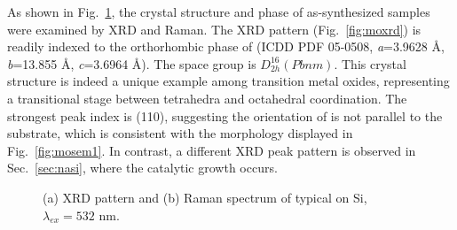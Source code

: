 As shown in Fig.~\ref{fig:mooxch}, the crystal structure and phase of as-synthesized samples were examined by XRD and Raman. The XRD pattern (Fig.~\ref{fig:moxrd}) is readily indexed to the orthorhombic phase of  (ICDD PDF 05-0508, \emph{a}=3.9628 \AA, \emph{b}=13.855 \AA, \emph{c}=3.6964 \AA). The space group is $D_{2h}^{16}(Pbnm)$. This crystal structure is indeed a unique example among transition metal oxides, representing a transitional stage between tetrahedra and octahedral coordination.\cite{Itoh2001a} The strongest peak index is (110), suggesting the orientation of  is not parallel to the substrate, which is consistent with the morphology displayed in Fig.~\ref{fig:mosem1}. In contrast, a different XRD peak pattern is observed in Sec.~\ref{sec:nasi}, where the catalytic growth occurs.
\begin{figure}[htb]
\centering
{}\hspace{0.04\textwidth}
\caption[Crystalline phase characterization of  on Si]{(a) XRD pattern and (b) Raman spectrum of typical  on Si, $\lambda_{ex} = 532$ nm.}
\label{fig:mooxch}
\end{figure}

